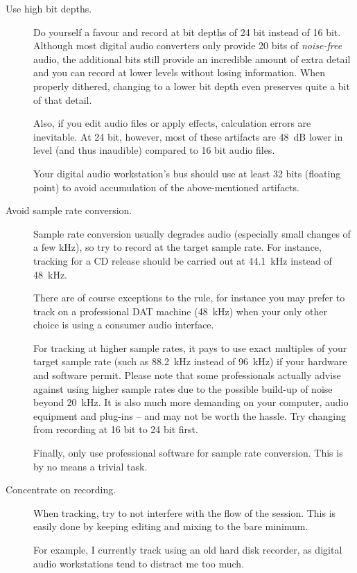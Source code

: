 \begin{description}
\item[Use high bit depths.]  Do yourself a favour and record at bit
  depths of 24 bit instead of 16 bit.  Although most digital audio
  converters only provide 20 bits of \emph{noise-free} audio, the
  additional bits still provide an incredible amount of extra detail
  and you can record at lower levels without losing information.  When
  properly dithered, changing to a lower bit depth even preserves
  quite a bit of that detail.

  Also, if you edit audio files or apply effects, calculation errors
  are inevitable.  At 24 bit, however, most of these artifacts are
  \SI{48}{\dB} lower in level (and thus inaudible) compared to 16 bit
  audio files.

  Your digital audio workstation's bus should use at least 32 bits
  (floating point) to avoid accumulation of the above-mentioned
  artifacts.

\item[Avoid sample rate conversion.]  Sample rate conversion usually
  degrades audio (especially small changes of a few \si{\kilo\hertz}),
  so try to record at the target sample rate.  For instance, tracking
  for a CD release should be carried out at \SI{44.1}{\kilo\hertz}
  instead of \SI{48}{\kilo\hertz}.

  There are of course exceptions to the rule, for instance you may
  prefer to track on a professional DAT machine (\SI{48}{\kilo\hertz})
  when your only other choice is using a consumer audio interface.

  For tracking at higher sample rates, it pays to use exact multiples
  of your target sample rate (such as \SI{88.2}{\kilo\hertz} instead
  of \SI{96}{\kilo\hertz}) if your hardware and software permit.
  Please note that some professionals actually advise against using
  higher sample rates due to the possible build-up of noise beyond
  \SI{20}{\kilo\hertz}.  It is also much more demanding on your
  computer, audio equipment and plug-ins -- and may not be worth the
  hassle.  Try changing from recording at 16 bit to 24 bit first.

  Finally, only use professional software for sample rate conversion.
  This is by no means a trivial task.

\item[Concentrate on recording.]  When tracking, try to not interfere
  with the flow of the session.  This is easily done by keeping
  editing and mixing to the bare minimum.

  For example, I currently track using an old hard disk recorder, as
  digital audio workstations tend to distract me too much.


\end{description}
